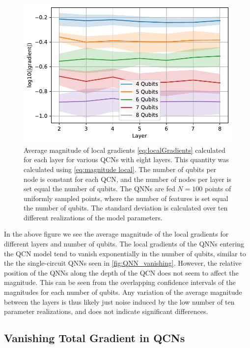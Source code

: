 \begin{figure}[H]
    \centering
    \includegraphics[width=12cm]{latex/figures/vanishing_gradient_partial_input.pdf}
    \caption{Average magnitude of local gradients \autoref{eq:localGradients} calculated for each layer for various QCNs with eight layers. This quantity was calculated using \autoref{eq:magnitude local}. The number of qubits per node is constant for each QCN, and the number of nodes per layer is set equal the number of qubits. The QNNs are fed $N=100$ points of uniformly sampled points, where the number of features is set equal the number of qubits. The standard deviation is calculated over ten different realizations of the model parameters.}
    \label{fig:QCN_local_vanishing}
\end{figure}

In the above figure we see the average magnitude of the local gradients for different layers and number of qubits. The local gradients of the QNNs entering the QCN model tend to vanish exponentially in the number of qubits, similar to the the single-circuit QNNs seen in \autoref{fig:QNN_vanishing}. However, the relative position of the QNNs along the depth of the QCN does not seem to affect the magnitude. This can be seen from the overlapping confidence intervals of the magnitudes for each number of qubits. Any variation of the average magnitude between the layers is thus likely just noise induced by the low number of ten parameter realizations, and does not indicate significant differences.

\subsection{Vanishing Total Gradient in QCNs}\label{sec:Vanishing Total Gradients in QCNs}

